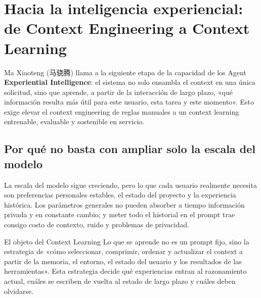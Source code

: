 \section{Hacia la inteligencia experiencial: de Context Engineering a Context Learning}

Ma Xiaoteng (马骁腾) llama a la siguiente etapa de la capacidad de los Agent \textbf{Experiential Intelligence}: el sistema no solo ensambla el context en una única solicitud, sino que aprende, a partir de la interacción de largo plazo, «qué información resulta más útil para este usuario, esta tarea y este momento». Esto exige elevar el context engineering de reglas manuales a un context learning entrenable, evaluable y sostenible en servicio.


\subsection{Por qué no basta con ampliar solo la escala del modelo}

La escala del modelo sigue creciendo, pero lo que cada usuario realmente necesita son preferencias personales estables, el estado del proyecto y la experiencia histórica. Los parámetros generales no pueden absorber a tiempo información privada y en constante cambio; y meter todo el historial en el prompt trae consigo costo de contexto, ruido y problemas de privacidad.



\begin{importantbox}{El objeto del Context Learning}
Lo que se aprende no es un prompt fijo, sino la estrategia de «cómo seleccionar, comprimir, ordenar y actualizar el context a partir de la memoria, el entorno, el estado del usuario y los resultados de las herramientas». Esta estrategia decide qué experiencias entran al razonamiento actual, cuáles se escriben de vuelta al estado de largo plazo y cuáles deben olvidarse.
\end{importantbox}

